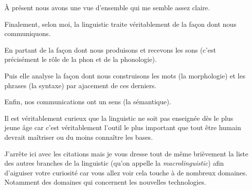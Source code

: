 \begin{center}
\begin{mdframed}[style=tradstyle, frametitle={\exFR{Traduction} de l'extrait précédent}]
\end{mdframed}  
\end{center}


À présent nous avons une vue d'ensemble qui me semble assez
claire.

Finalement, selon moi, la \gls{linguistic} traite véritablement de
la façon dont nous communiquons.

En partant de la façon dont nous produisons et recevons les sons
(c'est précisément le rôle de la \gls{phon} et de la phonologie).

Puis elle analyse la façon dont nous construisons les mots (la
morphologie) et les phrases (la syntaxe) par ajacement de ces
derniers.

Enfin, nos communications ont un sens (la sémantique).

Il est véritablement curieux que la \gls{linguistic} ne soit pas enseignée
dès le plus jeune âge car c'est véritablement l'outil le plus
important que tout être humain devrait maîtriser ou du moins connaître les bases.

J'arrête ici avec les citations mais je vous dresse tout de même
brièvement la liste des autres branches de la \gls{linguistic} (qu'on
appelle la \emph{macro\gls{linguistic}}) afin d'aiguiser votre curiosité
car vous allez voir cela touche à de nombreux domaines. Notamment des
domaines qui concernent les nouvelles technologies.

